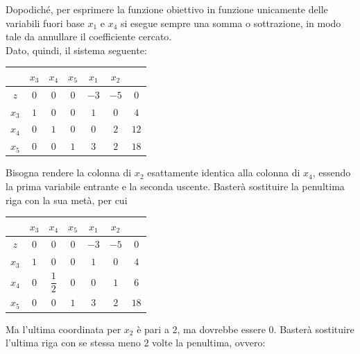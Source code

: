 \documentclass[a4paper]{extarticle}
\renewcommand\arraystretch{}
\begin{document}
Dopodiché, per esprimere la funzione obiettivo in funzione unicamente delle variabili fuori base $x_1$ e $x_4$ si esegue sempre una somma o sottrazione, in modo tale da annullare il coefficiente cercato.\\
Dato, quindi, il sistema seguente:
\vspace{1em}
\noindent
\begin{table}[H]
    \setlength{\tabcolsep}{4pt}
    \renewcommand{\arraystretch}{2.2}
    \noindent
    \centering
    \begin{tabular}{c|ccc|cc|c}
            & $x_3$ & $x_4$ & $x_5$ & $x_1$ & $x_2$ & \\
        \hline
        $z$   & $0$   & $0$   & $0$   & $-3$  & $-5$  & $0$\\
        \hline
        $x_3$ & $1$   & $0$   & $0$   & $1$   & $0$   & $4$\\ 
        $x_4$ & $0$   & $1$   & $0$   & $0$   & $2$   & $12$\\
        $x_5$ & $0$   & $0$   & $1$   & $3$   & $2$   & $18$\\
    \end{tabular}
\end{table}
\noindent
Bisogna rendere la colonna di $x_2$ esattamente identica alla colonna di $x_4$, essendo la prima variabile entrante e la seconda uscente. Basterà sostituire la penultima riga con la sua metà, per cui
\vspace{1em}
\noindent
\begin{table}[H]
    \setlength{\tabcolsep}{4pt}
    \renewcommand{\arraystretch}{2.2}
    \noindent
    \centering
    \begin{tabular}{c|ccc|cc|c}
        & $x_3$ & $x_4$ & $x_5$ & $x_1$ & $x_2$ & \\
        \hline
        $z$   & $0$   & $0$   & $0$   & $-3$  & $-5$  & $0$\\
        \hline
        $x_3$ & $1$   & $0$   & $0$   & $1$   & $0$   & $4$\\ 
        $x_4$ & $0$   & $\dfrac{1}{2}$   & $0$   & $0$   & $1$   & $6$\\
        $x_5$ & $0$   & $0$   & $1$   & $3$   & $2$   & $18$\\
    \end{tabular}
\end{table}
\noindent
Ma l'ultima coordinata per $x_2$ è pari a $2$, ma dovrebbe essere $0$. Basterà sostituire l'ultima riga con se stessa meno $2$ volte la penultima, ovvero:
\end{document}
